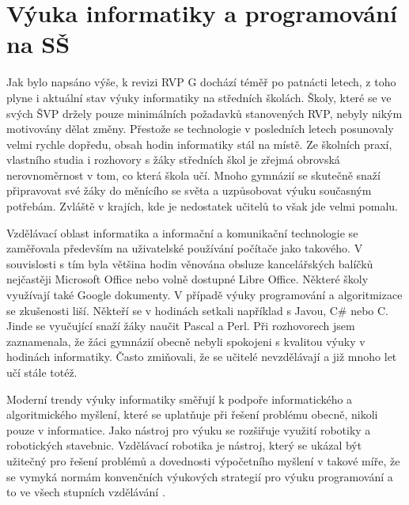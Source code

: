 \documentclass[
  digital,     %
  oneside,     %
  nosansbold,  %
  colorbold, %
  lof,         %
  nolot,         %
]{fithesis4}
\begin{document}
\section{Výuka informatiky a programování na SŠ}
Jak bylo napsáno výše, k revizi RVP G dochází téměř po patnácti letech, z toho plyne i aktuální stav výuky informatiky na středních školách. Školy, které se ve svých ŠVP držely pouze minimálních požadavků stanovených RVP, nebyly nikým motivovány dělat změny. Přestože se technologie v posledních letech posunovaly velmi rychle dopředu, obsah hodin informatiky stál na místě. Ze školních praxí, vlastního studia i rozhovory s žáky středních škol je zřejmá obrovská nerovnoměrnost v tom, co která škola učí. Mnoho gymnázií se skutečně snaží připravovat své žáky do měnícího se světa a uzpůsobovat výuku současným potřebám. Zvláště v krajích, kde je nedostatek učitelů to však jde velmi pomalu.

Vzdělávací oblast informatika a informační a komunikační technologie se zaměřovala především na uživatelské používání počítače jako takového. V souvislosti s tím byla většina hodin věnována obsluze kancelářských balíčků nejčastěji Microsoft Office nebo volně dostupné Libre Office. Některé školy využívají také Google dokumenty. V případě výuky programování a algoritmizace se zkušenosti liší. Někteří se v hodinách setkali například s Javou, C\# nebo C. Jinde se vyučující snaží žáky naučit Pascal a Perl. Při rozhovorech jsem zaznamenala, že  žáci gymnázií obecně nebyli spokojeni s kvalitou výuky v hodinách informatiky. Často zmiňovali, že se učitelé nevzdělávají a již mnoho let učí stále totéž.

Moderní trendy výuky informatiky směřují k podpoře informatického a algoritmického myšlení, které se uplatňuje při řešení problému obecně, nikoli pouze v informatice. Jako nástroj pro výuku se rozšiřuje využití robotiky a robotických stavebnic. Vzdělávací robotika je nástroj, který se ukázal být užitečný pro řešení problémů a dovednosti výpočetního myšlení v takové míře, že se vymyká normám konvenčních výukových strategií pro výuku programování a to ve všech stupních vzdělávání \cite{Noor20}. 

\end{document}
